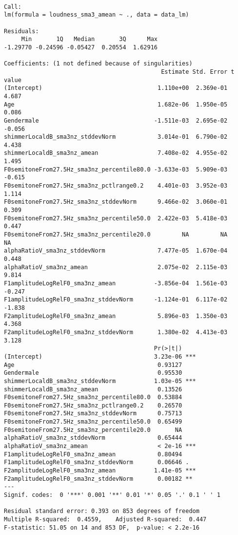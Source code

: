 \documentclass[
  letterpaper,
  DIV=11,
  numbers=noendperiod]{scrartcl}
\begin{document}
\begin{verbatim}

Call:
lm(formula = loudness_sma3_amean ~ ., data = data_lm)

Residuals:
     Min       1Q   Median       3Q      Max 
-1.29770 -0.24596 -0.05427  0.20554  1.62916 

Coefficients: (1 not defined because of singularities)
                                             Estimate Std. Error t value
(Intercept)                                 1.110e+00  2.369e-01   4.687
Age                                         1.682e-06  1.950e-05   0.086
Gendermale                                 -1.511e-03  2.695e-02  -0.056
shimmerLocaldB_sma3nz_stddevNorm            3.014e-01  6.790e-02   4.438
shimmerLocaldB_sma3nz_amean                 7.408e-02  4.955e-02   1.495
F0semitoneFrom27.5Hz_sma3nz_percentile80.0 -3.633e-03  5.909e-03  -0.615
F0semitoneFrom27.5Hz_sma3nz_pctlrange0.2    4.401e-03  3.952e-03   1.114
F0semitoneFrom27.5Hz_sma3nz_stddevNorm      9.466e-02  3.060e-01   0.309
F0semitoneFrom27.5Hz_sma3nz_percentile50.0  2.422e-03  5.418e-03   0.447
F0semitoneFrom27.5Hz_sma3nz_percentile20.0         NA         NA      NA
alphaRatioV_sma3nz_stddevNorm               7.477e-05  1.670e-04   0.448
alphaRatioV_sma3nz_amean                    2.075e-02  2.115e-03   9.814
F1amplitudeLogRelF0_sma3nz_amean           -3.856e-04  1.561e-03  -0.247
F1amplitudeLogRelF0_sma3nz_stddevNorm      -1.124e-01  6.117e-02  -1.838
F2amplitudeLogRelF0_sma3nz_amean            5.896e-03  1.350e-03   4.368
F2amplitudeLogRelF0_sma3nz_stddevNorm       1.380e-02  4.413e-03   3.128
                                           Pr(>|t|)    
(Intercept)                                3.23e-06 ***
Age                                         0.93127    
Gendermale                                  0.95530    
shimmerLocaldB_sma3nz_stddevNorm           1.03e-05 ***
shimmerLocaldB_sma3nz_amean                 0.13526    
F0semitoneFrom27.5Hz_sma3nz_percentile80.0  0.53884    
F0semitoneFrom27.5Hz_sma3nz_pctlrange0.2    0.26570    
F0semitoneFrom27.5Hz_sma3nz_stddevNorm      0.75713    
F0semitoneFrom27.5Hz_sma3nz_percentile50.0  0.65499    
F0semitoneFrom27.5Hz_sma3nz_percentile20.0       NA    
alphaRatioV_sma3nz_stddevNorm               0.65444    
alphaRatioV_sma3nz_amean                    < 2e-16 ***
F1amplitudeLogRelF0_sma3nz_amean            0.80494    
F1amplitudeLogRelF0_sma3nz_stddevNorm       0.06646 .  
F2amplitudeLogRelF0_sma3nz_amean           1.41e-05 ***
F2amplitudeLogRelF0_sma3nz_stddevNorm       0.00182 ** 
---
Signif. codes:  0 '***' 0.001 '**' 0.01 '*' 0.05 '.' 0.1 ' ' 1

Residual standard error: 0.393 on 853 degrees of freedom
Multiple R-squared:  0.4559,    Adjusted R-squared:  0.447 
F-statistic: 51.05 on 14 and 853 DF,  p-value: < 2.2e-16
\end{verbatim}
\end{document}
